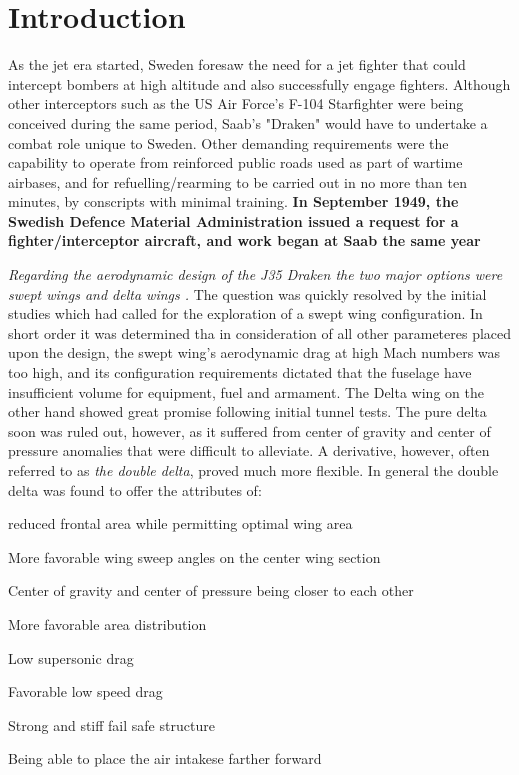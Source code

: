 \section{Introduction}

As the jet era started, Sweden foresaw the need for a jet fighter that could intercept bombers at high 
altitude and also successfully engage fighters. Although other interceptors such as the 
US Air Force's F-104 Starfighter were being conceived during the same period, 
Saab's "Draken" would have to undertake a combat role unique to Sweden. 
Other demanding requirements were the capability to operate from reinforced public roads 
used as part of wartime airbases, and for refuelling/rearming to be 
carried out in no more than ten minutes, by conscripts with minimal training. 
\textbf{In September 1949, the Swedish Defence Material Administration issued a request for a fighter/interceptor aircraft, and work began at Saab the same year}

\textit{Regarding the aerodynamic design of the J35 Draken the two major options were swept wings and delta wings \cite{dorr_aerofax_1987}.}
The question was quickly resolved by the initial studies which had called for the
exploration of a swept wing configuration. In short order it  was determined tha
in consideration of all other parameteres placed upon the design, 
the swept wing's aerodynamic drag at high Mach numbers was too high, 
and its configuration requirements dictated that the fuselage have insufficient 
volume for equipment, fuel and armament.
The Delta wing on the other hand showed great promise following initial tunnel 
tests. The pure delta soon was ruled out, however, as it suffered from center 
of gravity and center of pressure anomalies that were difficult to alleviate. 
A derivative, however, often referred to as \textit{the double delta}, proved much more flexible. 
In general the double delta was found to offer the attributes of:
\begin{itemize*}
    \item reduced frontal area while permitting optimal wing area
    \item More favorable wing sweep angles on the center wing section
    \item Center of gravity and center of pressure being closer to each other
    \item More favorable area distribution
    \item Low supersonic drag
    \item Favorable low speed drag
    \item Strong and stiff fail safe structure
    \item Being able to place the air intakese farther forward
\end{itemize*}


